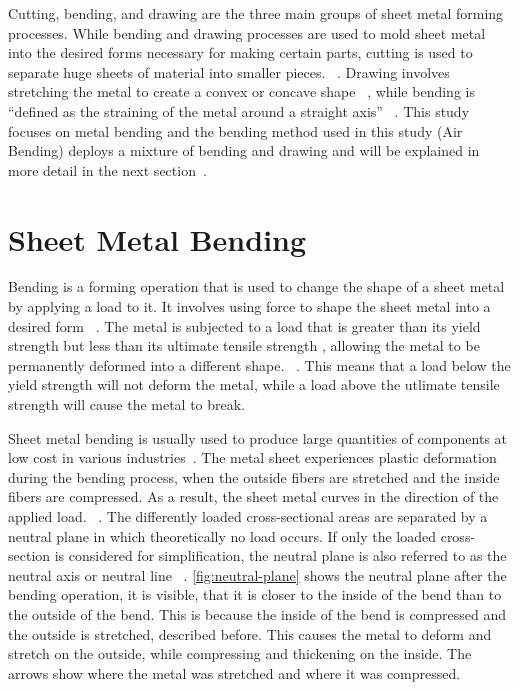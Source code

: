 Cutting, bending, and drawing are the three main groups of sheet metal forming processes.
While bending and drawing processes are used to mold sheet metal into the desired forms necessary for making certain
parts, cutting is used to separate huge sheets of material into smaller pieces.
~\cite[p. 405]{groover2020fundamentals}.
Drawing involves stretching the metal to create a convex or concave shape
~\cite[p. 416]{groover2020fundamentals}, while bending is ``defined as the straining of the
metal around a straight axis''
~\cite[p. 412]{groover2020fundamentals}.
This study focuses on metal bending and the bending method used in this study (Air Bending) deploys a mixture of
bending and drawing and will be explained in more detail in the next
section~\cite[pp. 416]{groover2020fundamentals}.


\section{Sheet Metal Bending}\label{sec:bending}
Bending is a forming operation that is used to change the shape of a sheet metal by
applying a load to it.
It involves using force to shape the sheet metal into a desired form
~\cite[p. 1]{dib2020single}.
The metal is subjected to a load that is greater than its yield strength but less than its ultimate tensile strength
, allowing the metal to be permanently deformed into a different shape.
~\cite[p. 1]{baig2021machine}.
This means that a load below the yield strength will not deform the metal, while a load above the utlimate tensile
strength will cause the metal to break.

Sheet metal bending is usually used to produce large quantities of components at low cost in various
industries~\cite[p. 1]{dib2020single}.
The metal sheet experiences plastic deformation during the bending process, when the outside fibers are stretched and
the inside fibers are compressed.
As a result, the sheet metal curves in the direction of the applied load.
~\cite[pp. 1--3]{baig2021machine}.
The differently loaded cross-sectional areas are separated by a neutral plane in which theoretically no load occurs.
If only the loaded cross-section is considered for simplification, the neutral plane is also referred to as the
neutral axis or neutral line
~\cite[pp. 67]{gustafson1998analytical}.
\cref{fig:neutral-plane} shows the neutral plane after the bending operation, it is
visible, that it is closer to the inside of the bend than to the outside of the bend.
This is because the inside of the bend is compressed and the outside is stretched, described before.
This causes the metal to deform and stretch on the outside, while compressing and thickening on the inside.
The arrows show where the metal was stretched and where it was compressed.

